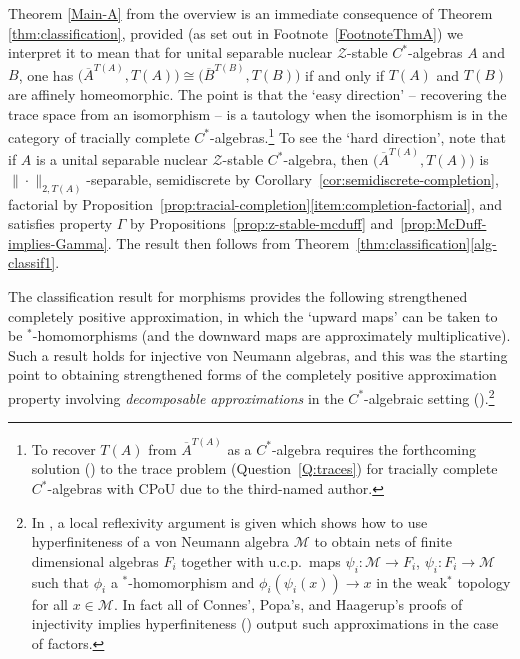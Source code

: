 \documentclass[a4paper,11pt]{amsart}
\theoremstyle{definition}
\numberwithin{equation}{section}
\numberwithin{theorem}{section}
\newcommand{\Z}{\mathcal Z}
\newcommand{\M}{\mathcal{M}}
\newcommand{\completion}[2]{\overline{#1}^{#2}}
\begin{document}
Theorem \ref{Main-A} from the overview is an immediate consequence of Theorem \ref{thm:classification}, provided (as set out in Footnote~\ref{FootnoteThmA}) we interpret it to mean that for unital separable nuclear $\Z$-stable $C^*$-algebras $A$ and $B$, one has $\big(\completion{A}{T(A)},T(A)\big)\cong \big(\completion{B}{T(B)},T(B)\big)$ if and only if $T(A)$ and $T(B)$ are affinely homeomorphic. The point is that the `easy direction' -- recovering the trace space from an isomorphism -- is a tautology when the isomorphism is in the category of tracially complete $C^*$-algebras.\footnote{To recover $T(A)$ from $\completion{A}{T(A)}$ as a $C^*$-algebra requires the forthcoming solution (\cite{Ev24}) to the trace problem (Question~\ref{Q:traces}) for tracially complete $C^*$-algebras with CPoU due to the third-named author.}  To see the `hard direction', note that if $A$ is a unital separable nuclear $\mathcal Z$-stable $C^*$-algebra, then $\big(\completion{A}{T(A)}, T(A) \big)$ is $\|\cdot\|_{2, T(A)}$-separable, semidiscrete by Corollary~\ref{cor:semidiscrete-completion}, factorial by Proposition~\ref{prop:tracial-completion}\ref{item:completion-factorial}, and satisfies property $\Gamma$ by Propositions~\ref{prop:z-stable-mcduff} and~\ref{prop:McDuff-implies-Gamma}.  The result then follows from Theorem~\ref{thm:classification}\ref{alg-classif1}. 

The classification result for morphisms provides the following strengthened completely positive approximation, in which the `upward maps' can be taken to be $^*$-homomorphisms (and the downward maps are approximately multiplicative).  Such a result holds for injective von Neumann algebras, and this was the starting point to obtaining strengthened forms of the completely positive approximation property involving \emph{decomposable approximations} in the $C^*$-algebraic setting (\cite{BCW16, CS20, HKW12}).\footnote{In \cite[Section 1]{HKW12}, a local reflexivity argument is given which shows how to use hyperfiniteness of a von Neumann algebra $\M$ to obtain nets of finite dimensional algebras $F_i$ together with u.c.p.\  maps $\psi_i\colon \M\to F_i$, $\psi_i\colon F_i\to \M$ such that $\phi_i$ a $^*$-homomorphism and $\phi_i(\psi_i(x))\to x$ in the weak$^*$ topology for all $x\in\M$.  In fact all of Connes', Popa's, and Haagerup's proofs of injectivity implies hyperfiniteness (\cite{Co76,Po86,Ha85}) output such approximations in the case of factors.  }
\end{document}
